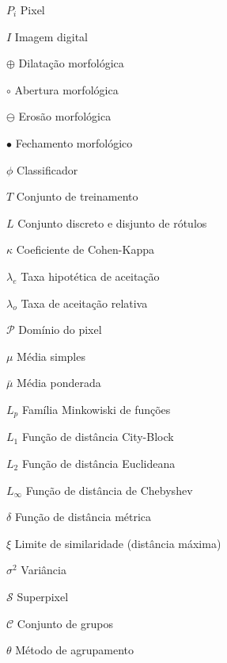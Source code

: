 \blankpage
\begin{simbolos}
    \item[$P_i$]         Pixel
    \item[$I$]           Imagem digital 
    \item[$\oplus$]      Dilatação morfológica
    \item[$\circ$]       Abertura morfológica
    \item[$\ominus$]     Erosão morfológica
    \item[$\bullet$]     Fechamento morfológico
    \item[$\phi$]        Classificador
    \item[$T$]           Conjunto de treinamento
    \item[$L$]           Conjunto discreto e disjunto de rótulos
    \item[$\kappa$]      Coeficiente de Cohen-Kappa
    \item[$\lambda_e$]   Taxa hipotética de aceitação
    \item[$\lambda_o$]   Taxa de aceitação relativa
    \item[$\mathcal{P}$] Domínio do pixel
    \item[$\mu$]         Média simples
    \item[$\bar{\mu}$]   Média ponderada
    \item[{$L_p$}]       Família Minkowiski de funções
    \item[{$L_1$}]       Função de distância City-Block
    \item[{$L_2$}]       Função de distância Euclideana
    \item[{$L_\infty$}]  Função de distância de Chebyshev
    \item[$\delta$]      Função de distância métrica
    \item[$\xi$]         Limite de similaridade (distância máxima)
    \item[$\sigma^2$]    Variância    
    \item[$\mathcal{S}$] Superpixel
    \item[$\mathcal{C}$] Conjunto de grupos
    \item[$\theta$]      Método de agrupamento     
\end{simbolos}
